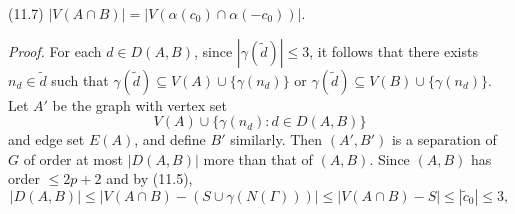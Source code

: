 \stmt
(11.7) $|V(A \cap B)| = |V(\alpha(c_0) \cap \alpha(-c_0))|.$

\textit{Proof.} For each $d \in D(A, B)$, since $|\gamma(\tilde{d})| \le 3$, it follows that there exists $n_d \in \tilde{d}$ such that $\gamma(\tilde{d}) \subseteq V(A) \cup \{\gamma(n_d)\}$ or $\gamma(\tilde{d}) \subseteq V(B) \cup \{\gamma(n_d)\}$. Let $A'$ be the graph with vertex set
\begin{equation*}
V(A) \cup \{\gamma(n_d) \colon d \in D(A, B)\}
\end{equation*}
and edge set $E(A)$, and define $B'$ similarly. Then $(A', B')$ is a separation of $G$ of order at most $|D(A, B)|$ more than that of $(A, B)$. Since $(A, B)$ has order $\le 2p + 2$ and by (11.5),
\begin{equation*}
|D(A, B)| \le |V(A \cap B) - (S \cup \gamma(N(\Gamma)))| \le |V(A \cap B) - S| \le |\tilde{c}_0| \le 3,
\end{equation*}
